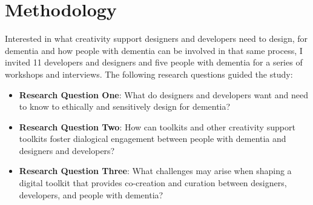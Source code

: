 

\renewcommand{\arraystretch}{1.4}


\section{Methodology}
\label{D3:Methodology}
Interested in what creativity support designers and developers need to design, for dementia and how people with dementia can be involved in that same process, I invited 11 developers and designers and five people with dementia for a series of workshops and interviews. The following research questions guided the study:
\begin{itemize}
    \item \textbf{Research Question One}: What do designers and developers want and need to know to ethically and sensitively design for dementia?
    \item \textbf{Research Question Two}: How can toolkits and other creativity support toolkits foster dialogical engagement between people with dementia and designers and developers?
    \item \textbf{Research Question Three}: What challenges may arise when shaping a digital toolkit that provides co-creation and curation between designers, developers, and people with dementia?
\end{itemize}

